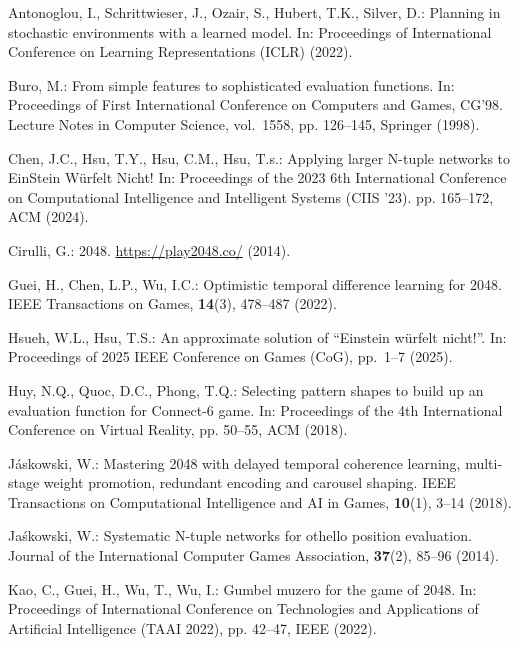 \begin{thebibliography}{10}

Antonoglou, I., Schrittwieser, J., Ozair, S., Hubert, T.K., Silver, D.:
  Planning in stochastic environments with a learned model. In: Proceedings of International
  Conference on Learning Representations (ICLR) (2022).

Buro, M.: From simple features to sophisticated evaluation functions. In:
  Proceedings of First International Conference on Computers and Games, CG'98.
  Lecture Notes in Computer Science, vol.~1558, pp. 126--145, Springer (1998).

Chen, J.C., Hsu, T.Y., Hsu, C.M., Hsu, T.s.: Applying larger {N}-tuple networks
  to {EinStein} {W\"{u}rfelt} {Nicht!} In: Proceedings of the 2023 6th
  International Conference on Computational Intelligence and Intelligent
  Systems (CIIS '23). pp. 165--172, ACM (2024).

Cirulli, G.: 2048. \url{https://play2048.co/} (2014).

Guei, H., Chen, L.P., Wu, I.C.: Optimistic temporal difference learning for
  2048. IEEE Transactions on Games, \textbf{14}(3), 478--487 (2022).

Hsueh, W.L., Hsu, T.S.: An approximate solution of ``Einstein w\"urfelt
  nicht!''. In: Proceedings of 2025 IEEE Conference on Games (CoG), pp.~1--7 (2025).

Huy, N.Q., Quoc, D.C., Phong, T.Q.: Selecting pattern shapes to build up an
  evaluation function for {Connect-6} game. In: Proceedings of the 4th
  International Conference on Virtual Reality, pp. 50--55, ACM (2018).

J\'{a}skowski, W.: Mastering 2048 with delayed temporal coherence learning,
  multi-stage weight promotion, redundant encoding and carousel shaping. IEEE
  Transactions on Computational Intelligence and AI in Games, \textbf{10}(1), 3--14 (2018).

Ja{\'s}kowski, W.: Systematic {N}-tuple networks for othello position
  evaluation. Journal of the International Computer Games Association,
  \textbf{37}(2),  85--96 (2014).

Kao, C., Guei, H., Wu, T., Wu, I.: Gumbel muzero for the game of 2048. In:
  Proceedings of International Conference on Technologies and Applications of Artificial
  Intelligence ({TAAI} 2022), pp. 42--47, {IEEE} (2022).


\end{thebibliography}
